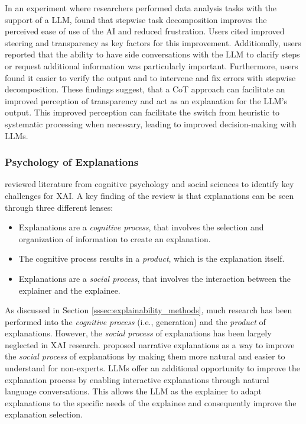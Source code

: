 In an experiment where researchers performed data analysis tasks with the support of a \ac{LLM}, \textcite{Kazemitabaar2024} found that stepwise task decomposition improves the perceived ease of use of the \ac{AI} and reduced frustration. Users cited improved steering and transparency as key factors for this improvement. Additionally, users reported that the ability to have side conversations with the \ac{LLM} to clarify steps or request additional information was particularly important. Furthermore, users found it easier to verify the output and to intervene and fix errors with stepwise decomposition. These findings suggest, that a \ac{CoT} approach can facilitate an improved perception of transparency and act as an explanation for the \ac{LLM}'s output. This improved perception can facilitate the switch from heuristic to systematic processing when necessary, leading to improved decision-making with \acp{LLM}.

\subsubsection{Psychology of Explanations} \label{sssec:psychology_explanations}

\textcite{Miller2019} reviewed literature from cognitive psychology and social sciences to identify key challenges for \ac{XAI}. A key finding of the review is that explanations can be seen through three different lenses:

\begin{itemize}
    \item Explanations are a \textit{cognitive process}, that involves the selection and organization of information to create an explanation.
    \item The cognitive process results in a \textit{product}, which is the explanation itself.
    \item Explanations are a \textit{social process}, that involves the interaction between the explainer and the explainee.
\end{itemize}

As discussed in Section \ref{sssec:explainability_methods}, much research has been performed into the \textit{cognitive process} (i.e., generation) and the \textit{product} of explanations. However, the \textit{social process} of explanations has been largely neglected in \ac{XAI} research. \textcite{Martens2025} proposed narrative explanations as a way to improve the \textit{social process} of explanations by making them more natural and easier to understand for non-experts. \acp{LLM} offer an additional opportunity to improve the explanation process by enabling interactive explanations through natural language conversations. This allows the \ac{LLM} as the explainer to adapt explanations to the specific needs of the explainee and consequently improve the explanation selection.

